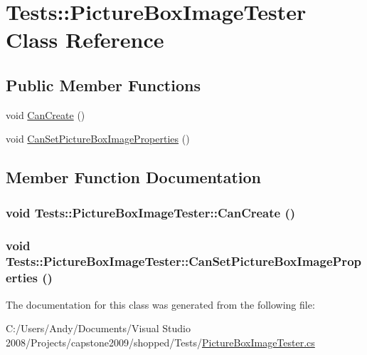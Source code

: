 \hypertarget{class_tests_1_1_picture_box_image_tester}{
\section{Tests::PictureBoxImageTester Class Reference}
\label{class_tests_1_1_picture_box_image_tester}
}
\subsection*{Public Member Functions}
\begin{DoxyCompactItemize}
\item 
void \hyperlink{class_tests_1_1_picture_box_image_tester_a06d878583fb2603dc081802ee581a6f2}{CanCreate} ()
\item 
void \hyperlink{class_tests_1_1_picture_box_image_tester_ac56c0c43888757c672917fe9080bac9b}{CanSetPictureBoxImageProperties} ()
\end{DoxyCompactItemize}


\subsection{Member Function Documentation}
\hypertarget{class_tests_1_1_picture_box_image_tester_a06d878583fb2603dc081802ee581a6f2}{
\subsubsection[{CanCreate}]{\setlength{\rightskip}{0pt plus 5cm}void Tests::PictureBoxImageTester::CanCreate ()}}
\label{class_tests_1_1_picture_box_image_tester_a06d878583fb2603dc081802ee581a6f2}
\hypertarget{class_tests_1_1_picture_box_image_tester_ac56c0c43888757c672917fe9080bac9b}{
\subsubsection[{CanSetPictureBoxImageProperties}]{\setlength{\rightskip}{0pt plus 5cm}void Tests::PictureBoxImageTester::CanSetPictureBoxImageProperties ()}}
\label{class_tests_1_1_picture_box_image_tester_ac56c0c43888757c672917fe9080bac9b}


The documentation for this class was generated from the following file:\begin{DoxyCompactItemize}
\item 
C:/Users/Andy/Documents/Visual Studio 2008/Projects/capstone2009/shopped/Tests/\hyperlink{_picture_box_image_tester_8cs}{PictureBoxImageTester.cs}\end{DoxyCompactItemize}
